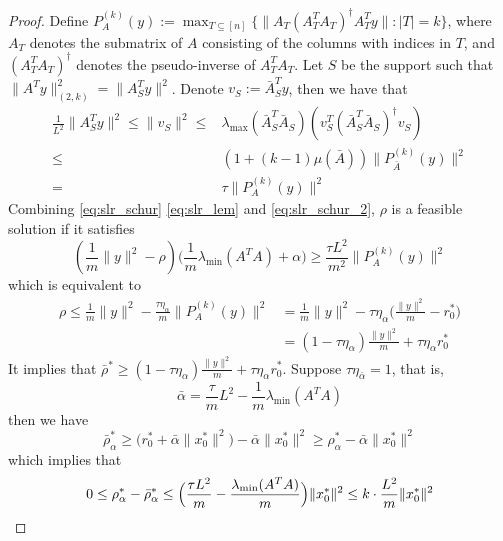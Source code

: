 \documentclass[11pt]{amsart}
\theoremstyle{plain}
\theoremstyle{definition}
\theoremstyle{remark}
\begin{document}
\begin{proof}
		Define  $P^{(k)}_A(y):=\max_{T\subseteq[n]}\{\|A_T(A_T^TA_T)^{\dagger}A_T^T y\|: |T| = k\}$, where $A_T$ denotes the submatrix of $A$ consisting of the columns with indices in $T$, and  $(A_T^TA_T)^{\dagger}$ denotes the pseudo-inverse of $A_T^TA_T$. 
        Let \(S\) be the support such that \(\|A^Ty\|^2_{(2,k)} = \|A_S^Ty\|^2\). Denote \(v_S:=\bar A^T_Sy\),  then we have that
		\begin{equation}\label{eq:slr_schur_2}
			\begin{split}
				\tfrac{1}{L^2}\|A_S^Ty\|^2 \leq  \|v_S\|^2 \leq& \lambda_{\max}(\bar A_S^T\bar A_S) (v_S^T (\bar A_S^T\bar A_S)^{\dagger}v_S) \\
				\leq & (1+(k-1)\mu(\bar A)) \|P_{\bar A}^{(k)}(y)\|^2\\
				= & \tau  \|P_{A}^{(k)}(y)\|^2
			\end{split}
		\end{equation}
		Combining \eqref{eq:slr_schur} \eqref{eq:slr_lem} and \eqref{eq:slr_schur_2}, $\rho$ is a feasible solution if it satisfies
		\begin{equation}
			(\frac{1}{m}\|y\|^2 - \rho) \big(\frac{1}{m}\lambda_{\min}(A^TA) + \alpha \big)\geq \frac{\tau L^2}{m^2} \|P_A^{(k)}(y)\|^2 
		\end{equation}
		which is equivalent to
		\begin{equation}
			\begin{split}
				\rho \leq \tfrac{1}{m}\|y\|^2 - \tfrac{\tau \eta_\alpha}{m} \|P_A^{(k)}(y)\|^2 
				&= \tfrac{1}{m}\|y\|^2 - \tau \eta_\alpha \Big(\tfrac{\|y\|^2}{m} - r^*_0\Big) \\
				&= (1-\tau\eta_\alpha)\tfrac{\|y\|^2}{m} + \tau\eta_\alpha r^*_{0}
			\end{split}
		\end{equation}
		It implies that $\bar \rho^* \geq (1-\tau\eta_\alpha)\tfrac{\|y\|^2}{m} + \tau\eta_\alpha r^*_{0}$. Suppose $\tau \eta_{\bar\alpha} = 1$, that is,
		\[
		\bar \alpha=\frac{\tau}{m} L^2 - \frac{1}{m}\lambda_{\min}(A^TA)
		\]
		then we have
		\begin{equation}
			\bar\rho^*_{\alpha}\geq \Big(r^*_0  + \bar \alpha \|x^*_0\|^2\Big) - \bar \alpha \|x^*_0\|^2 \geq \rho^*_{\alpha} - \bar \alpha \|x^*_0\|^2
		\end{equation}
		which implies that
		\begin{equation}\label{eq:slr_upper_bound}
			0\leq \rho^*_{\alpha} - \bar\rho^*_{\alpha} \leq \Big(\frac{\tau L^2}{m} - \frac{\lambda_{\min}(A^TA)}{m}\Big) \|x^*_0\|^2 \leq k\cdot\frac{L^2}{m}\|x^*_0\|^2
			\qedhere
		\end{equation} 
	\end{proof}
	
\end{document}

